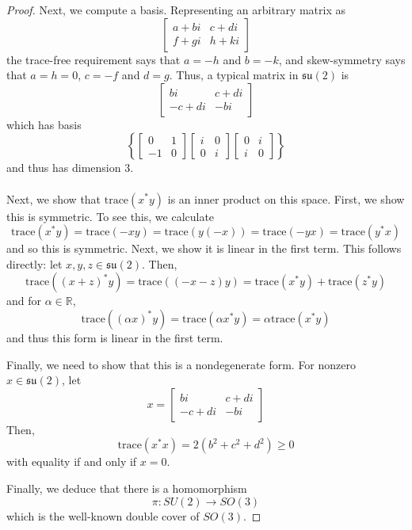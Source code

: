 \documentclass[fontsize=11pt]{scrartcl} %
\numberwithin{equation}{section} %
\numberwithin{figure}{section} %
\numberwithin{table}{section} %
\newcommand{\R}{\mathbb{R}}
\begin{document}
\begin{proof}
    Next, we compute a basis. Representing an arbitrary matrix as
    \[
\begin{bmatrix}
    a+bi &c+di\\
    f+gi &h+ki
\end{bmatrix}
    \]
    the trace-free requirement says that $a=-h$ and $b=-k$, and skew-symmetry
    says that $a=h=0$, $c=-f$ and  $d=g$. Thus, a typical matrix in
    $\mathfrak{su}(2)$ is
    \[
\begin{bmatrix}
    bi & c+di\\
    -c+di &-bi
\end{bmatrix}
    \]
    which has basis
    \[
        \left\{ 
            \begin{bmatrix}
                0&1\\
                -1&0
            \end{bmatrix}
            \begin{bmatrix}
                i&0\\
                0&i
            \end{bmatrix}
            \begin{bmatrix}
                0&i\\
                i&0
            \end{bmatrix}
        \right\}
    \]
    and thus has dimension $3$.
    \\
    \\
    Next, we show that $\text{trace}(x^*y)$ is an inner product on this space.
    First, we show this is symmetric. To see this, we calculate
    \[
        \text{trace}(x^*y) = \text{trace}(-xy) = \text{trace}(y(-x)) =
        \text{trace}(-yx) = \text{trace}(y^*x)
    \]
    and so this is symmetric. Next, we show it is linear in the first term. This
    follows directly: let $x,y,z\in \mathfrak{su}(2)$. Then,
    \[
        \text{trace}((x+z)^*y) = \text{trace}((-x-z)y) = \text{trace}(x^*y) +
        \text{trace}(z^*y)
    \]
    and for $\alpha\in \R$,
    \[
        \text{trace}((\alpha x)^*y) = \text{trace}(\alpha x^*y) =
        \alpha\text{trace}(x^*y)
    \]
    and thus this form is linear in the first term.

    Finally, we need to show that this is a nondegenerate form. For nonzero
    $x\in \mathfrak{su}(2)$, let
    \[
        x=
\begin{bmatrix}
    bi & c+di\\
    -c+di &-bi
\end{bmatrix}
    \]
    Then,
    \[
        \text{trace}(x^*x) = 2(b^2+c^2+d^2) \geq 0
    \]
    with equality if and only if $x=0$.

    Finally, we deduce that there is a homomorphism
    \[
        \pi:SU(2)\to SO(3)
    \]
    which is the well-known double cover of $SO(3)$.
\end{proof}
\end{document}
